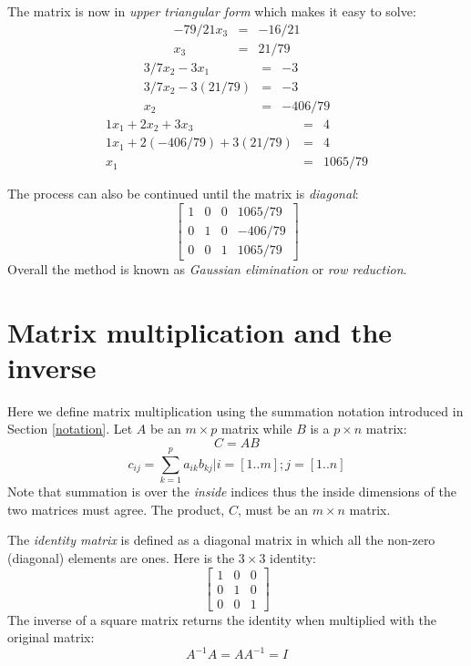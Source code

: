 \documentclass{article}
\begin{document}
The matrix is now in {\it upper triangular form} which makes it easy to
solve:
\begin{eqnarray}
	-79/21 x_3 & = & -16/21 \\
	x_3 & = & 21/79
\end{eqnarray}
\begin{eqnarray}
	3/7 x_2 - 3 x_1 & = & -3 \\
	3/7 x_2 - 3 (21/79) & = & -3 \\
	x_2 & = & - 406/79
\end{eqnarray}
\begin{eqnarray}
	1 x_1 + 2 x_2 + 3 x_3 & = & 4 \\
	1 x_1 + 2 (- 406/79) + 3 (21/79) & = & 4 \\
	x_1 & = & 1065/79
\end{eqnarray}

The process can also be continued until the matrix is {\it diagonal}:
\begin{equation}
	\left [ \begin{array}{ccc|c}
			1 & 0 & 0 & 1065/79 \\
			0 & 1 & 0 & -406/79 \\
			0 & 0 & 1 & 1065/79
	\end{array} \right ]
\end{equation}
Overall the method is known as {\it Gaussian elimination} or
{\it row reduction}.

\section{Matrix multiplication and the inverse}

Here we define matrix multiplication using the summation
notation introduced in Section \ref{notation}.
Let $A$ be an $m \times p$ matrix while $B$ is a $p \times n$ matrix:
\begin{equation}
	C = A B
\end{equation}
\begin{equation}
	c_{ij} = \sum_{k=1}^p a_{ik} b_{kj}| i=[1..m]; j=[1..n]
\end{equation}
Note that summation is over the {\it inside} indices thus the inside dimensions
of the two matrices must agree.
The product, $C$, must be an $m \times n$ matrix.

The {\it identity matrix} is defined as a diagonal matrix in which all the
non-zero (diagonal) elements are ones.
Here is the $3 \times 3$ identity:
\begin{equation}
	\left [ \begin{array}{ccc}
			1 & 0 & 0 \\
			0 & 1 & 0 \\
			0 & 0 & 1 
	\end{array} \right ]
\end{equation}
The inverse of a square matrix returns the identity when multiplied with
the original matrix:
\begin{equation}
	A^{-1} A = A A^{-1} = I
\end{equation}
\end{document}
